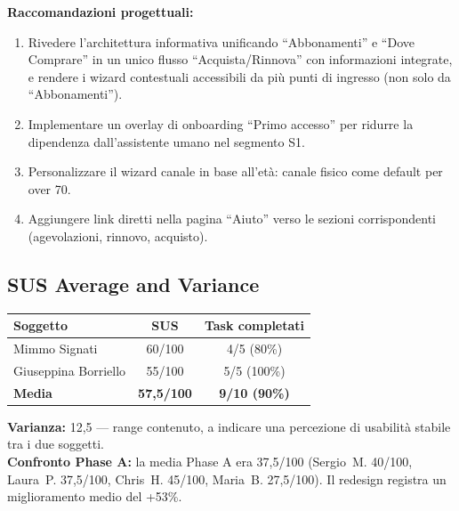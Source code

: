 ﻿\documentclass[11pt,a4paper]{article}
\begin{document}
\begin{tcolorbox}[base]
\noindent\textbf{Raccomandazioni progettuali:}
\begin{enumerate}[leftmargin=*]
  \item Rivedere l'architettura informativa unificando ``Abbonamenti''
  e ``Dove Comprare'' in un unico flusso ``Acquista/Rinnova'' con
  informazioni integrate, e rendere i wizard contestuali accessibili
  da più punti di ingresso (non solo da ``Abbonamenti'').
  \item Implementare un overlay di onboarding ``Primo accesso'' per
  ridurre la dipendenza dall'assistente umano nel segmento S1.
  \item Personalizzare il wizard canale in base all'età: canale fisico
  come default per over 70.
  \item Aggiungere link diretti nella pagina ``Aiuto'' verso le sezioni
  corrispondenti (agevolazioni, rinnovo, acquisto).
\end{enumerate}
\end{tcolorbox}

\vspace{0.2cm}

\subsection*{SUS Average and Variance}
\begin{tcolorbox}[base]
\begin{center}
\begin{tabular}{lcc}
\toprule
\textbf{Soggetto} & \textbf{SUS} & \textbf{Task completati} \\
\midrule
Mimmo Signati & 60/100 & 4/5 (80\%) \\
Giuseppina Borriello & 55/100 & 5/5 (100\%) \\
\midrule
\textbf{Media} & \textbf{57,5/100} & \textbf{9/10 (90\%)} \\
\bottomrule
\end{tabular}
\end{center}

\medskip

\noindent\textbf{Varianza:} 12,5 --- range contenuto, a
indicare una percezione di usabilità stabile tra i due soggetti.\\[0.2cm]
\textbf{Confronto Phase A:} la media Phase A era 37,5/100 (Sergio~M.
40/100, Laura~P. 37,5/100, Chris~H. 45/100, Maria~B. 27,5/100). Il
redesign registra un miglioramento medio del +53\%.
\end{tcolorbox}

\vspace{0.2cm}
\end{document}
